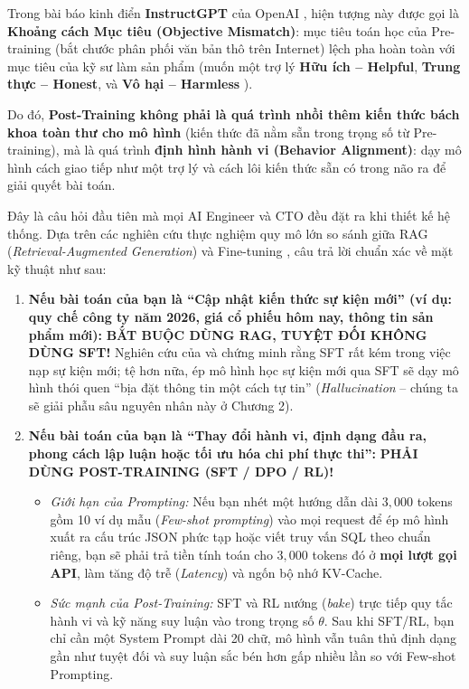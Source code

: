 Trong bài báo kinh điển \textbf{InstructGPT} của OpenAI \citep{ouyang2022training}, hiện tượng này được gọi là \textbf{Khoảng cách Mục tiêu (Objective Mismatch)}: mục tiêu toán học của Pre-training (bắt chước phân phối văn bản thô trên Internet) lệch pha hoàn toàn với mục tiêu của kỹ sư làm sản phẩm (muốn một trợ lý \textbf{Hữu ích -- Helpful}, \textbf{Trung thực -- Honest}, và \textbf{Vô hại -- Harmless} \citealt{askell2021general}).

Do đó, \textbf{Post-Training không phải là quá trình nhồi thêm kiến thức bách khoa toàn thư cho mô hình} (kiến thức đã nằm sẵn trong trọng số từ Pre-training), mà là quá trình \textbf{định hình hành vi (Behavior Alignment)}: dạy mô hình cách giao tiếp như một trợ lý và cách lôi kiến thức sẵn có trong não ra để giải quyết bài toán.

\begin{debate}
Đây là câu hỏi đầu tiên mà mọi AI Engineer và CTO đều đặt ra khi thiết kế hệ thống. Dựa trên các nghiên cứu thực nghiệm quy mô lớn so sánh giữa RAG (\textit{Retrieval-Augmented Generation}) và Fine-tuning \citep{ovadia2024fine, gekhman2024does}, câu trả lời chuẩn xác về mặt kỹ thuật như sau:
\begin{enumerate}[leftmargin=1.2cm]
    \item \textbf{Nếu bài toán của bạn là ``Cập nhật kiến thức sự kiện mới'' (ví dụ: quy chế công ty năm 2026, giá cổ phiếu hôm nay, thông tin sản phẩm mới):} \textbf{BẮT BUỘC DÙNG RAG, TUYỆT ĐỐI KHÔNG DÙNG SFT!}
    Nghiên cứu của \citet{ovadia2024fine} và \citet{gekhman2024does} chứng minh rằng SFT rất kém trong việc nạp sự kiện mới; tệ hơn nữa, ép mô hình học sự kiện mới qua SFT sẽ dạy mô hình thói quen ``bịa đặt thông tin một cách tự tin'' (\textit{Hallucination} -- chúng ta sẽ giải phẫu sâu nguyên nhân này ở Chương 2).
    \item \textbf{Nếu bài toán của bạn là ``Thay đổi hành vi, định dạng đầu ra, phong cách lập luận hoặc tối ưu hóa chi phí thực thi'':} \textbf{PHẢI DÙNG POST-TRAINING (SFT / DPO / RL)!}
    \begin{itemize}
        \item \textit{Giới hạn của Prompting:} Nếu bạn nhét một hướng dẫn dài $3,000$ tokens gồm 10 ví dụ mẫu (\textit{Few-shot prompting}) vào mọi request để ép mô hình xuất ra cấu trúc JSON phức tạp hoặc viết truy vấn SQL theo chuẩn riêng, bạn sẽ phải trả tiền tính toán cho $3,000$ tokens đó ở \textbf{mọi lượt gọi API}, làm tăng độ trễ (\textit{Latency}) và ngốn bộ nhớ KV-Cache.
        \item \textit{Sức mạnh của Post-Training:} SFT và RL nướng (\textit{bake}) trực tiếp quy tắc hành vi và kỹ năng suy luận vào trong trọng số $\theta$. Sau khi SFT/RL, bạn chỉ cần một System Prompt dài 20 chữ, mô hình vẫn tuân thủ định dạng gần như tuyệt đối và suy luận sắc bén hơn gấp nhiều lần so với Few-shot Prompting.
    \end{itemize}
\end{enumerate}
\end{debate}

